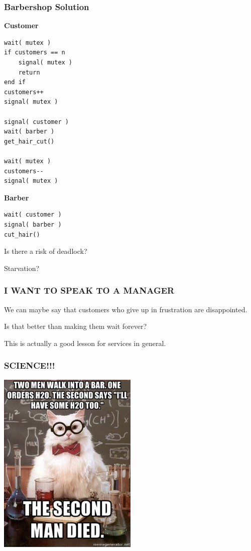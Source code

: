 \begin{frame}[fragile]
\frametitle{Barbershop Solution}

\begin{multicols}{2}
\textbf{Customer}
  \begin{lstlisting}
wait( mutex )
if customers == n
    signal( mutex )
    return
end if
customers++
signal( mutex )

signal( customer )
wait( barber )
get_hair_cut()

wait( mutex )
customers--
signal( mutex )
\end{lstlisting}
\columnbreak
\textbf{Barber}
  \begin{lstlisting}
wait( customer )
signal( barber )
cut_hair()
  \end{lstlisting}
\end{multicols}

Is there a risk of deadlock?

Starvation?

\end{frame}


\begin{frame}
\frametitle{I WANT TO SPEAK TO A MANAGER}

We can maybe say that customers who give up in frustration are disappointed.

Is that better than making them wait forever?

This is actually a good lesson for services in general. 

\end{frame}


\begin{frame}
\frametitle{SCIENCE!!!}

\begin{center}
	\includegraphics[width=0.5\textwidth]{images/h2o2.jpg}
\end{center}


\end{frame}

